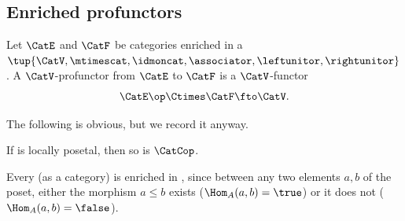\subsection{Enriched profunctors}
\begin{ctdefinition}
    \label{def:enriched_profunctor}
    Let $\CatE$ and $\CatF$ be categories enriched in a ~$\tup{\CatV, \mtimescat, \idmoncat, \associator, \leftunitor, \rightunitor}$.
    A $\CatV$-profunctor from $\CatE$ to $\CatF$ is a $\CatV$-functor
    \begin{equation}
        \CatE\op \Ctimes \CatF \fto \CatV.
    \end{equation}
\end{ctdefinition}






    The following is obvious, but we record it anyway.
    \begin{lemma}
        \label{lem:loc_pos_op}
        If \CatC is locally posetal, then so is $\CatCop$.
    \end{lemma}

    \begin{example}
        \label{ex:enrichbool}
        Every  (as a category) is enriched in \Bool, since between any two elements $a,b$ of the poset, either the morphism $a \leq b$ exists ($\Hom_A(a,b) = \true$) or it does not ($\Hom_A(a,b) = \false$).
    \end{example}

